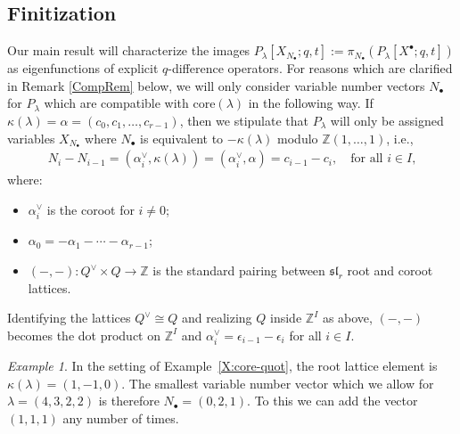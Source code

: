 \documentclass{amsart}
\newcommand{\Z}{\mathbb{Z}}
\newcommand{\K}{\mathbb{K}}
\newcommand{\nd}{n_\bullet}
\newcommand{\kb}{\kappa}
\newcommand{\Xd}{X^\bullet}
\newcommand{\core}{\mathrm{core}}
\newcommand{\fS}{\mathfrak{S}}
\theoremstyle{remark}
\newtheorem{ex}[thm]{Example}
\numberwithin{thm}{section}
\numberwithin{equation}{section}
\begin{document}

\subsection{Finitization}\label{Finite}
Our main result will characterize the images $P_\lambda[X_{N_\bullet};q,t]:=\pi_{N_\bullet}(P_\lambda[\Xd;q,t])$ as eigenfunctions of explicit $q$-difference operators. For reasons which are clarified in Remark \ref{CompRem} below, we will only consider variable number vectors $N_\bullet$ for $P_\lambda$ which are compatible with $\core(\lambda)$ in the following way.
If $\kb(\lambda)=\alpha=(c_0,c_1,\dotsc,c_{r-1})$, then we stipulate that $P_\lambda$ will only be assigned variables $X_{N_\bullet}$ where $N_\bullet$ is equivalent to $-\kb(\lambda)$ modulo $\Z(1,\dotsc,1)$, i.e.,
\begin{align}\label{Compatibility}
N_{i}-N_{i-1}=(\alpha_i^\vee,\kb(\lambda))=(\alpha_i^\vee,\alpha)=c_{i-1}-c_{i},\quad \text{for all $i\in I$,}
\end{align}
where:
\begin{itemize}
    \item $\alpha_i^\vee$ is the coroot for $i\not=0$;
    \item $\alpha_0=-\alpha_1-\cdots-\alpha_{r-1}$;
    \item $(-,-):Q^\vee\times Q\to \Z$ is the standard pairing between $\mathfrak{sl}_r$ root and coroot lattices.
\end{itemize}
 Identifying the lattices $Q^\vee\cong Q$ and realizing $Q$ inside $\Z^I$ as above, $(-,-)$ becomes the dot product on $\Z^I$ and $\alpha_i^\vee=\epsilon_{i-1}-\epsilon_i$ for all $i\in I$.

\begin{ex}
In the setting of Example~\ref{X:core-quot}, the root lattice element is $\kb(\lambda)=(1,-1,0)$. The smallest variable number vector which we allow for $\lambda=(4,3,2,2)$ is therefore $N_\bullet=(0,2,1)$. To this we can add the vector $(1,1,1)$ any number of times.
\end{ex}
\end{document}
